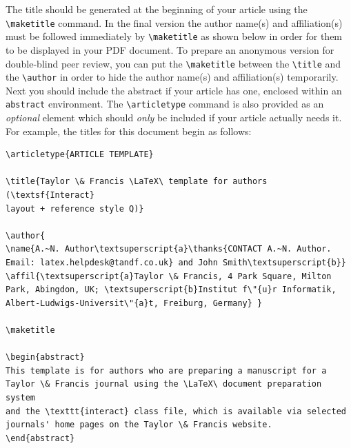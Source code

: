 \documentclass[]{interact}
\theoremstyle{plain}%
\theoremstyle{definition}
\theoremstyle{remark}
\begin{document}
The title should be generated at the beginning of your article using the \verb"\maketitle" command.
In the final version the author name(s) and affiliation(s) must be followed immediately by \verb"\maketitle" as shown below in order for them to be displayed in your PDF document.
To prepare an anonymous version for double-blind peer review, you can put the \verb"\maketitle" between the \verb"\title" and the \verb"\author" in order to hide the author name(s) and affiliation(s) temporarily.
Next you should include the abstract if your article has one, enclosed within an \texttt{abstract} environment.
The \verb"\articletype" command is also provided as an \emph{optional} element which should \emph{only} be included if your article actually needs it.
For example, the titles for this document begin as follows:
\begin{verbatim}
\articletype{ARTICLE TEMPLATE}

\title{Taylor \& Francis \LaTeX\ template for authors (\textsf{Interact}
layout + reference style Q)}

\author{
\name{A.~N. Author\textsuperscript{a}\thanks{CONTACT A.~N. Author.
Email: latex.helpdesk@tandf.co.uk} and John Smith\textsuperscript{b}}
\affil{\textsuperscript{a}Taylor \& Francis, 4 Park Square, Milton
Park, Abingdon, UK; \textsuperscript{b}Institut f\"{u}r Informatik,
Albert-Ludwigs-Universit\"{a}t, Freiburg, Germany} }

\maketitle

\begin{abstract}
This template is for authors who are preparing a manuscript for a
Taylor \& Francis journal using the \LaTeX\ document preparation system
and the \texttt{interact} class file, which is available via selected
journals' home pages on the Taylor \& Francis website.
\end{abstract}
\end{verbatim}
\end{document}
